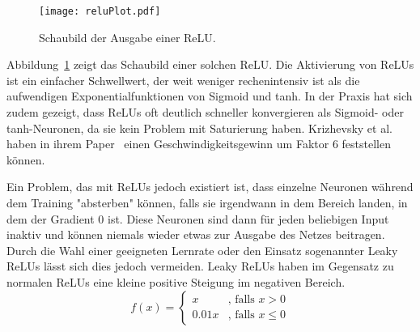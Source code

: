 \begin{figure}[h]
	\centering
	\texttt{[image: reluPlot.pdf]}
	\caption{Schaubild der Ausgabe einer ReLU.}
	\label{reluoutput}
\end{figure}
Abbildung~\ref{reluoutput} zeigt das Schaubild einer solchen ReLU. 
Die Aktivierung von ReLUs ist ein einfacher Schwellwert, der weit weniger rechenintensiv ist als die aufwendigen Exponentialfunktionen von Sigmoid und tanh.
In der Praxis hat sich zudem gezeigt, dass ReLUs oft deutlich schneller konvergieren als Sigmoid- oder tanh-Neuronen, da sie kein Problem mit Saturierung haben.
Krizhevsky et al. haben in ihrem Paper~\cite{NIPS2012_4824} einen Geschwindigkeitsgewinn um Faktor 6 feststellen können.

Ein Problem, das mit ReLUs jedoch existiert ist, dass einzelne Neuronen während dem Training "absterben" können, falls sie irgendwann in dem Bereich landen, in dem der Gradient 0 ist.
Diese Neuronen sind dann für jeden beliebigen Input inaktiv und können niemals wieder etwas zur Ausgabe des Netzes beitragen.
Durch die Wahl einer geeigneten Lernrate oder den Einsatz sogenannter Leaky ReLUs lässt sich dies jedoch vermeiden.
Leaky ReLUs haben im Gegensatz zu normalen ReLUs eine kleine positive Steigung im negativen Bereich.
\begin{equation}
	f(x) = \begin{cases}
		x &\text{, falls } x  >  0\\
		0.01 x &\text{, falls } x  \leq  0
	\end{cases}
\end{equation} 













